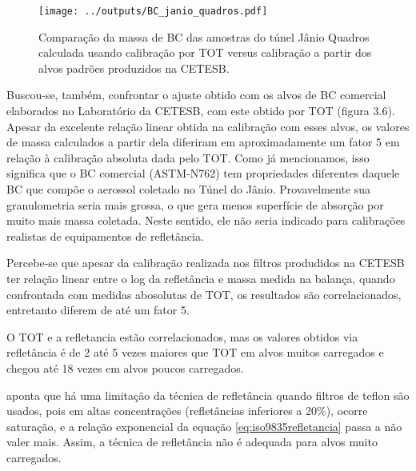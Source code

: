 \begin{figure}[H]
  \centering
  \begin{minipage}[b]{0.5\linewidth}
    \texttt{[image: ../outputs/BC\_janio\_quadros.pdf]}
    \caption{Comparação da massa de BC das amostras do túnel Jânio Quadros 
             calculada usando calibração por TOT versus calibração a partir dos 
             alvos padrões produzidos na CETESB. \label{fig:JQ}}
  \end{minipage}%
  \hspace{0.5cm}
  \begin{minipage}[b]{0.45\linewidth}
    \begin{small}
      
    \end{small}
  \end{minipage}
\end{figure}

Buscou-se, também, confrontar o ajuste obtido com os alvos de BC comercial 
elaborados no Laboratório da CETESB, com este obtido por TOT (figura 3.6). Apesar da excelente relação linear obtida na calibração com esses alvos, os valores de massa calculados a partir dela diferiram em aproximadamente um fator 5 em relação à calibração absoluta dada pelo TOT.
Como já mencionamos, isso significa que o BC comercial (ASTM-N762) tem propriedades diferentes daquele BC que compõe o aerossol coletado no Túnel do Jânio. Provavelmente sua granulometria seria mais grossa, o que gera menos superfície de absorção por muito mais massa coletada. Neste sentido, ele não seria indicado para calibrações realistas de equipamentos de refletância.

Percebe-se que apesar da calibração realizada nos filtros produdidos na CETESB
ter relação linear entre o log da refletância e massa medida na balança, quando
confrontada com medidas abosolutas de TOT, os resultados são correlacionados, 
entretanto diferem de até um fator 5. 

O TOT e a refletancia estão correlacionados, mas os valores obtidos via 
refletância é de 2 até 5 vezes maiores que TOT em alvos muitos carregados e 
chegou até 18 vezes em alvos poucos carregados.

\citet{taha2007} aponta que há uma limitação da técnica de refletância quando 
filtros de teflon são usados, pois em altas concentrações (refletâncias
inferiores a 20\%), ocorre saturação, e a relação exponencial da equação 
\ref{eq:iso9835refletancia} passa a não valer mais. Assim, a técnica de
refletância não é adequada para alvos muito carregados.

